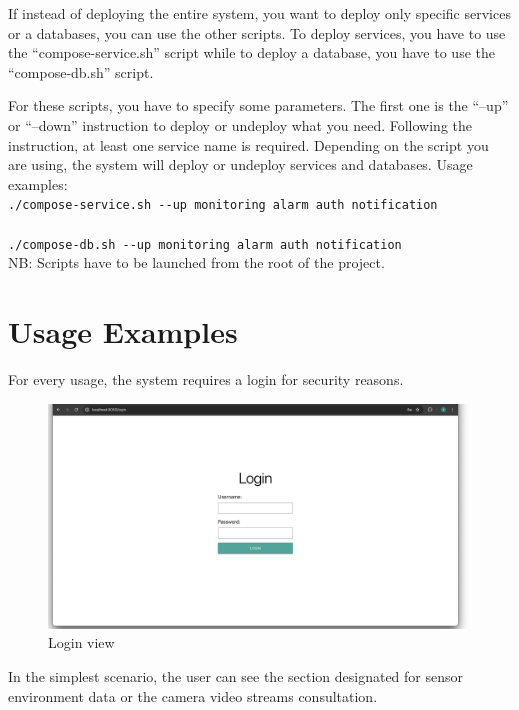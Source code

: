 \documentclass{scrartcl}
\begin{document}
    If instead of deploying the entire system, you want to deploy only specific services or a databases, you can use the other scripts.
    To deploy services, you have to use the ``compose-service.sh'' script while to deploy a database, you have to use the ``compose-db.sh'' script.

    For these scripts, you have to specify some parameters.
    The first one is the ``--up'' or ``--down'' instruction to deploy or undeploy what you need.
    Following the instruction, at least one service name is required.
    Depending on the script you are using, the system will deploy or undeploy services and databases.
    Usage examples:
    \\

    \verb|./compose-service.sh --up monitoring alarm auth notification|
    \\
    \\

    \verb|./compose-db.sh --up monitoring alarm auth notification|
    \\

    NB: Scripts have to be launched from the root of the project.

    \section{Usage Examples}

    For every usage, the system requires a login for security reasons.

    \begin{figure}
        \centering
        \includegraphics[scale=0.3]{img/usage/login_view}
        \caption{Login view}
        \label{fig:login_view}
    \end{figure}

    In the simplest scenario, the user can see the section designated for sensor environment data or the camera video streams consultation.
\end{document}
